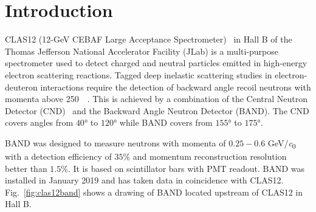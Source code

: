 \documentclass[3p,final,twocolumn]{elsarticle}
\begin{document}
\linenumbers


\setcounter{footnote}{0}
\renewcommand{\thefootnote}{\alph{footnote}}
\section{Introduction}


CLAS12 (12-GeV CEBAF Large Acceptance
Spectrometer)~\cite{Burkert:2020akg} in Hall B of the Thomas Jefferson
National Accelerator Facility (JLab) is a multi-purpose spectrometer
used to detect charged and neutral particles emitted in high-energy
electron scattering reactions.  Tagged deep inelastic scattering studies
in electron-deuteron interactions require the detection of backward
angle recoil
neutrons with momenta above \SI{250}{\mega\eVperc}.
This is achieved by a combination of the Central Neutron Detector
(CND)~\cite{Chatagnon:2020lwt} and the Backward Angle Neutron Detector
(BAND). The CND covers angles from $40$\si{\degree} to
$120$\si{\degree} while BAND covers from $155$\si{\degree} to
$175$\si{\degree}.

BAND was designed to measure neutrons with
momenta of $0.25 - 0.6$ \si{\GeV/\clight} with a detection efficiency
of $35$\% and momentum reconstruction resolution better than
$1.5\%$. It is based on scintillator bars with PMT readout.  BAND was
installed in January 2019 and has taken data in coincidence with
CLAS12. Fig.~\ref{fig:clas12band} shows a drawing of BAND located
upstream of CLAS12 in Hall B.
\end{document}
